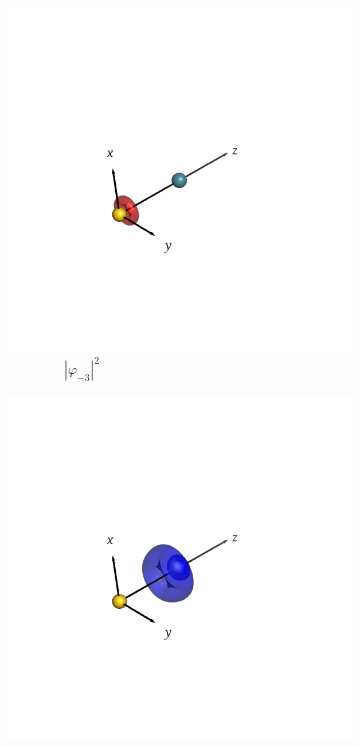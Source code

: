\documentclass[journal=inoraj,manuscript=article]{achemso}
\begin{document}
\begin{figure}[!h]
    \vspace{0.0cm}
    \begin{subfigure}[t]{0.32\textwidth}
        \centering
        \includegraphics[width=\linewidth]{./AuRn+/nocv-5.png} 
        \caption*{\ \ \ \ \ \ \ \ $|\varphi_{-3}|^2$} 
    \end{subfigure}
    \hfill
    \begin{subfigure}[t]{0.32\textwidth}
        \centering
        \includegraphics[width=\linewidth]{./AuRn+/nocv+5.png} 

\end{subfigure}
\end{figure}
\end{document}
